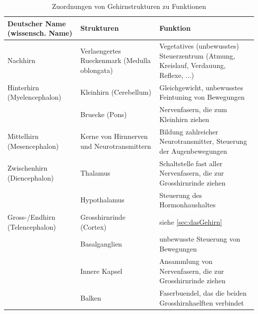 \begin{table}[!h]
\caption{Zuordnungen von Gehirnstrukturen zu Funktionen}
\label{Tabelle1}
\begin{tabularx}{\textwidth}{XXX}
\hline\hline

\textbf{Deutscher Name} \newline\textbf{(wissensch. Name)}\newline              & \textbf{Strukturen}                                    & \textbf{Funktion}                                                                             \\ \hline
Nachhirn                                      & Verlaengertes Rueckenmark (Medulla oblongata) & Vegetatives (unbewusstes) Steuerzentrum (Atmung, Kreislauf, Verdauung, Reflexe, ...) \\ \hline
Hinterhirn \newline(Myelencephalon)               & Kleinhirn (Cerebellum)                        & Gleichgewicht, unbewusstes Feintuning von Bewegungen                                 \\ \cline{2-3} 
                                          & Bruecke (Pons)                                & Nervenfasern, die zum Kleinhirn ziehen                                               \\ \hline
Mittelhirn \newline(Mesencephalon)                    & Kerne von Hirnnerven und Neurotransmittern    & Bildung zahlreicher Neurotransmitter, Steuerung der Augenbewegungen                  \\ \hline
Zwischenhirn \newline(Diencephalon)                   & Thalamus                                      & Schaltstelle fast aller Nervenfasern, die zur Grosshirnrinde ziehen                   \\ \cline{2-3} 
                                              & Hypothalamus                                  & Steuerung des Hormonhaushaltes                                                       \\ \hline
Gross-/Endhirn \newline(Telencephalon)                 & Grosshirnrinde (Cortex)                        & siehe \ref{sec:dasGehirn}                                                                            \\ \cline{2-3} 
                                              & Basalganglien                                 & unbewusste Steuerung von Bewegungen                                                  \\ \cline{2-3} 
                                              & Innere Kapsel                                 & Ansammlung von Nervenfasern, die zur Grosshirnrinde ziehen                            \\ \cline{2-3} 
                                              & Balken                                        & Faserbuendel, das die beiden Grosshirnhaelften verbindet                              \\ \hline\hline
\end{tabularx}
\end{table}

